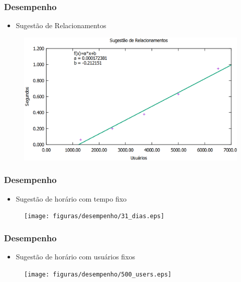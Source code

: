 \documentclass{beamer}
\begin{document}
\begin{frame}
\frametitle{Desempenho}

\begin{itemize}
	\item{Sugestão de Relacionamentos}
\end{itemize}

\begin{figure}[h]
	\centering
	\includegraphics[scale=0.35]{figuras/desempenho/sugestao_relacionamentos.eps}
\end{figure}

\end{frame}

\begin{frame}
\frametitle{Desempenho}

\begin{itemize}
	\item{Sugestão de horário com tempo fixo}
\end{itemize}

\begin{figure}[h]
	\centering
	\texttt{[image: figuras/desempenho/31\_dias.eps]}
\end{figure}

\end{frame}

\begin{frame}
\frametitle{Desempenho}

\begin{itemize}
	\item{Sugestão de horário com usuários fixos}
\end{itemize}

\begin{figure}[h]
	\centering
	\texttt{[image: figuras/desempenho/500\_users.eps]}
\end{figure}

\end{frame}
\end{document}
